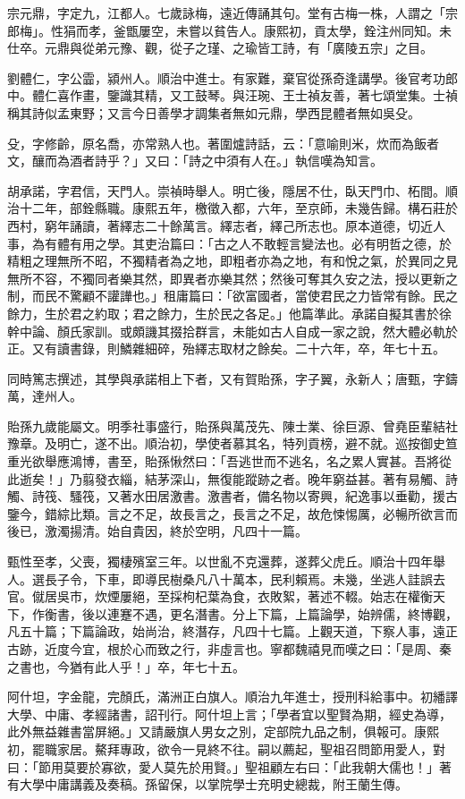 \begin{pinyinscope}
宗元鼎，字定九，江都人。七歲詠梅，遠近傳誦其句。堂有古梅一株，人謂之「宗郎梅」。性狷而孝，釜甑屢空，未嘗以貧告人。康熙初，貢太學，銓注州同知。未仕卒。元鼎與從弟元豫、觀，從子之瑾、之瑜皆工詩，有「廣陵五宗」之目。

劉體仁，字公霝，潁州人。順治中進士。有家難，棄官從孫奇逢講學。後官考功郎中。體仁喜作畫，鑒識其精，又工鼓琴。與汪琬、王士禎友善，著七頌堂集。士禎稱其詩似孟東野；又言今日善學才調集者無如元鼎，學西昆體者無如吳殳。

殳，字修齡，原名喬，亦常熟人也。著圍爐詩話，云：「意喻則米，炊而為飯者文，釀而為酒者詩乎？」又曰：「詩之中須有人在。」執信嘆為知言。

胡承諾，字君信，天門人。崇禎時舉人。明亡後，隱居不仕，臥天門巾、柘間。順治十二年，部銓縣職。康熙五年，檄徵入都，六年，至京師，未幾告歸。構石莊於西村，窮年誦讀，著繹志二十餘萬言。繹志者，繹己所志也。原本道德，切近人事，為有體有用之學。其吏治篇曰：「古之人不敢輕言變法也。必有明哲之德，於精粗之理無所不昭，不獨精者為之地，即粗者亦為之地，有和悅之氣，於異同之見無所不容，不獨同者樂其然，即異者亦樂其然；然後可奪其久安之法，授以更新之制，而民不驚顧不讙譁也。」租庸篇曰：「欲富國者，當使君民之力皆常有餘。民之餘力，生於君之約取；君之餘力，生於民之各足。」他篇準此。承諾自擬其書於徐幹中論、顏氏家訓。或頗譏其掇拾群言，未能如古人自成一家之說，然大體必軌於正。又有讀書錄，則鱗雜細碎，殆繹志取材之餘矣。二十六年，卒，年七十五。

同時篤志撰述，其學與承諾相上下者，又有賀貽孫，字子翼，永新人；唐甄，字鑄萬，達州人。

貽孫九歲能屬文。明季社事盛行，貽孫與萬茂先、陳士業、徐巨源、曾堯臣輩結社豫章。及明亡，遂不出。順治初，學使者慕其名，特列貢榜，避不就。巡按御史笪重光欲舉應鴻博，書至，貽孫愀然曰：「吾逃世而不逃名，名之累人實甚。吾將從此逝矣！」乃翦發衣緇，結茅深山，無復能蹤跡之者。晚年窮益甚。著有易觸、詩觸、詩筏、騷筏，又著水田居激書。激書者，備名物以寄興，紀逸事以垂勸，援古鑒今，錯綜比類。言之不足，故長言之，長言之不足，故危悚惕厲，必暢所欲言而後已，激濁揚清。始自貴因，終於空明，凡四十一篇。

甄性至孝，父喪，獨棲殯室三年。以世亂不克還葬，遂葬父虎丘。順治十四年舉人。選長子令，下車，即導民樹桑凡八十萬本，民利賴焉。未幾，坐逃人詿誤去官。僦居吳市，炊煙屢絕，至採枸杞葉為食，衣敗絮，著述不輟。始志在權衡天下，作衡書，後以連蹇不遇，更名潛書。分上下篇，上篇論學，始辨儒，終博觀，凡五十篇；下篇論政，始尚治，終潛存，凡四十七篇。上觀天道，下察人事，遠正古跡，近度今宜，根於心而致之行，非虛言也。寧都魏禧見而嘆之曰：「是周、秦之書也，今猶有此人乎！」卒，年七十五。

阿什坦，字金龍，完顏氏，滿洲正白旗人。順治九年進士，授刑科給事中。初繙譯大學、中庸、孝經諸書，詔刊行。阿什坦上言；「學者宜以聖賢為期，經史為導，此外無益雜書當屏絕。」又請嚴旗人男女之別，定部院九品之制，俱報可。康熙初，罷職家居。鰲拜專政，欲令一見終不往。嗣以薦起，聖祖召問節用愛人，對曰：「節用莫要於寡欲，愛人莫先於用賢。」聖祖顧左右曰：「此我朝大儒也！」著有大學中庸講義及奏稿。孫留保，以掌院學士充明史總裁，附王蘭生傳。


\end{pinyinscope}
